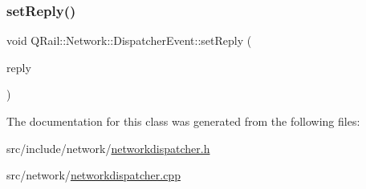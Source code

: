 \subsubsection{\texorpdfstring{setReply()}{setReply()}}
{\footnotesize\ttfamily void Q\+Rail\+::\+Network\+::\+Dispatcher\+Event\+::set\+Reply (\begin{DoxyParamCaption}\item[{Q\+Network\+Reply $\ast$}]{reply }\end{DoxyParamCaption})}



The documentation for this class was generated from the following files\+:\begin{DoxyCompactItemize}
\item 
src/include/network/\mbox{\hyperlink{networkdispatcher_8h}{networkdispatcher.\+h}}\item 
src/network/\mbox{\hyperlink{networkdispatcher_8cpp}{networkdispatcher.\+cpp}}\end{DoxyCompactItemize}
